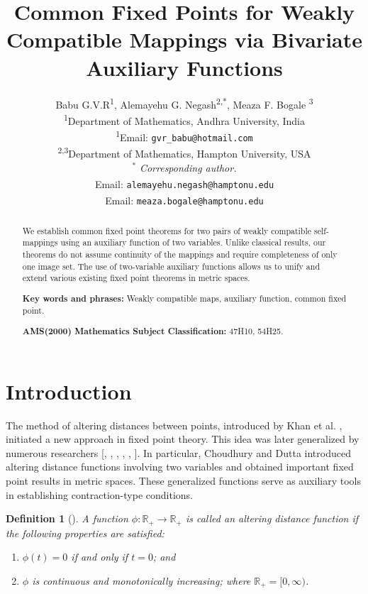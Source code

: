 \documentclass[11]{article}
\title{Common Fixed Points for Weakly Compatible Mappings via Bivariate Auxiliary Functions}
\author{Babu G.V.R\textsuperscript{1}, Alemayehu G. Negash\textsuperscript{2,*}, Meaza F. Bogale \textsuperscript{3}\\
\small \textsuperscript{1}Department of Mathematics, Andhra University, India\\
\small \textsuperscript{1}Email: \texttt{gvr\_babu@hotmail.com} \\
\small \textsuperscript{2,3}Department of Mathematics, Hampton University, USA\\
$^*$ \textit{Corresponding author.} \\
\small \textsuperscript{\dag}Email: \texttt{alemayehu.negash@hamptonu.edu}\\
\small \textsuperscript{\ddag}Email: \texttt{meaza.bogale@hamptonu.edu}
}
\newtheorem{definition}{Definition}[section]
\numberwithin{equation}{section}
\begin{document}
\maketitle

\begin{abstract}
We establish common fixed point theorems for two pairs of weakly compatible self-mappings using an auxiliary function of two variables. Unlike classical results, our theorems do not assume continuity of the mappings and require completeness of only one image set. The use of two-variable auxiliary functions allows us to unify and extend various existing fixed point theorems in metric spaces.


\textbf{Key words and phrases:} Weakly compatible maps, auxiliary function, common fixed point.

\textbf{AMS(2000) Mathematics Subject Classification:} 47H10, 54H25.
\end{abstract}

\section{Introduction}
The method of altering distances between points, introduced by Khan et al. \cite{Khan1984}, initiated a new approach in fixed point theory. This idea was later generalized by numerous researchers [\cite{Babu2004,Babu2007,Babu2001,Babu2007b}, \cite{Choudhury2005,Choudhury2000}, \cite{Naidu2001,Naidu2003}, \cite{Park1980}, \cite{Pathak1994}, \cite{Sastry1999,Sastry1998,Sastry2003,Sastry2000}]. In particular, Choudhury and Dutta  \cite{Choudhury2000} introduced altering distance functions involving two variables and obtained important fixed point results in metric spaces. These generalized functions serve as auxiliary tools in establishing contraction-type conditions.


\begin{definition}[\cite{Khan1984}]
A function $\phi:\mathbb{R}_{+}\to \mathbb{R}_{+}$ is called an altering distance function if the following properties are satisfied:
\begin{enumerate}
    \item[(a)] $\phi(t)=0$ if and only if $t=0$; and
    \item[(b)] $\phi$ is continuous and monotonically increasing; where $\mathbb{R}_{+}=[0,\infty)$.
\end{enumerate}
\end{definition}
\end{document}
